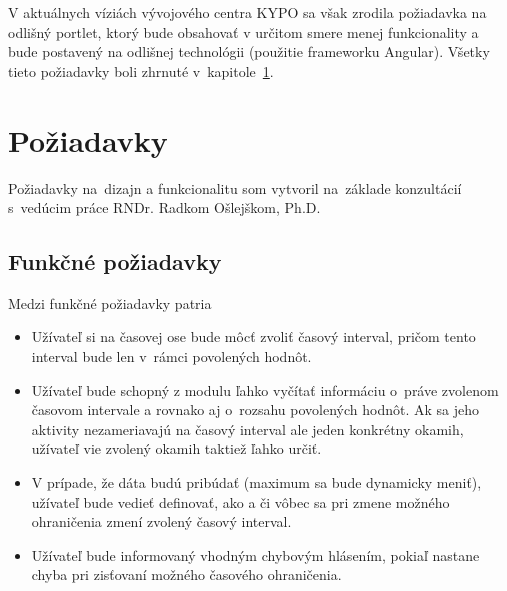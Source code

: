 \documentclass[
  printed, %
  twoside, %
  notable,   %
  nolof,   %
  nolot,   %
]{fithesis3}
\begin{document}
V aktuálnych víziách vývojového centra KYPO sa však zrodila požiadavka na odlišný portlet, ktorý bude obsahovať v určitom smere menej funkcionality a bude postavený na odlišnej technológii (použitie frameworku Angular). Všetky tieto požiadavky boli zhrnuté v~kapitole~\ref{requirements}.

\clearpage

\section{Požiadavky}
\label{requirements}
Požiadavky na~dizajn a funkcionalitu som vytvoril na~základe konzultácií s~vedúcim práce RNDr. Radkom Ošlejškom, Ph.D.

\subsection{Funkčné požiadavky}
\label{funkcne_poziadavky}
Medzi funkčné požiadavky patria
\begin{itemize}
\item Užívateľ si na časovej ose bude môcť zvoliť časový interval, pričom tento interval bude len v~rámci povolených hodnôt.
\item Užívateľ bude schopný z modulu ľahko vyčítať informáciu o~práve zvolenom časovom intervale a rovnako aj o~rozsahu povolených hodnôt. Ak sa jeho aktivity nezameriavajú na časový interval ale jeden konkrétny okamih, užívateľ vie zvolený okamih taktiež ľahko určiť.
\item V prípade, že dáta budú pribúdať (maximum sa bude dynamicky meniť), užívateľ bude vedieť definovať, ako a či vôbec sa pri zmene možného ohraničenia zmení zvolený časový interval.
\item Užívateľ bude informovaný vhodným chybovým hlásením, pokiaľ nastane chyba pri zisťovaní možného časového ohraničenia.
\end{itemize}
\end{document}
